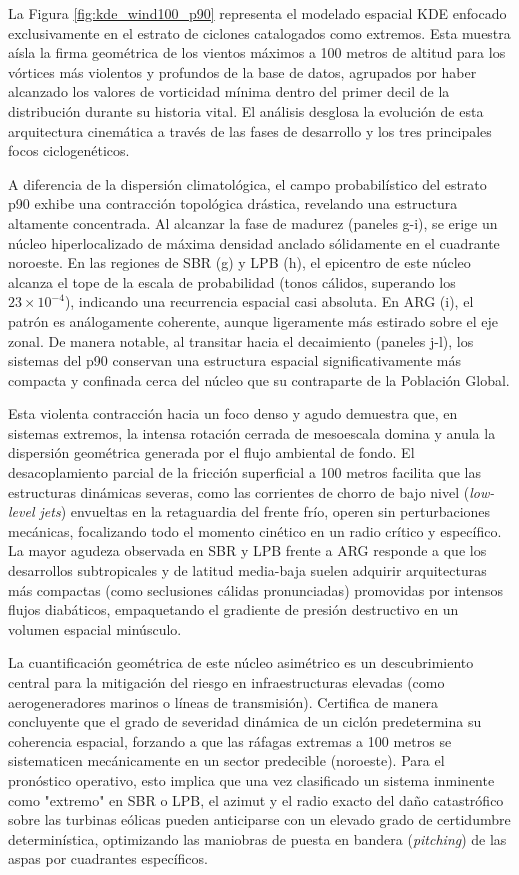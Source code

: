La Figura \ref{fig:kde_wind100_p90} representa el modelado espacial KDE enfocado exclusivamente en el estrato de ciclones catalogados como extremos. Esta muestra aísla la firma geométrica de los vientos máximos a 100 metros de altitud para los vórtices más violentos y profundos de la base de datos, agrupados por haber alcanzado los valores de vorticidad mínima dentro del primer decil de la distribución durante su historia vital. El análisis desglosa la evolución de esta arquitectura cinemática a través de las fases de desarrollo y los tres principales focos ciclogenéticos.

A diferencia de la dispersión climatológica, el campo probabilístico del estrato p90 exhibe una contracción topológica drástica, revelando una estructura altamente concentrada. Al alcanzar la fase de madurez (paneles g-i), se erige un núcleo hiperlocalizado de máxima densidad anclado sólidamente en el cuadrante noroeste. En las regiones de SBR (g) y LPB (h), el epicentro de este núcleo alcanza el tope de la escala de probabilidad (tonos cálidos, superando los $23 \times 10^{-4}$), indicando una recurrencia espacial casi absoluta. En ARG (i), el patrón es análogamente coherente, aunque ligeramente más estirado sobre el eje zonal. De manera notable, al transitar hacia el decaimiento (paneles j-l), los sistemas del p90 conservan una estructura espacial significativamente más compacta y confinada cerca del núcleo que su contraparte de la Población Global. 

Esta violenta contracción hacia un foco denso y agudo demuestra que, en sistemas extremos, la intensa rotación cerrada de mesoescala domina y anula la dispersión geométrica generada por el flujo ambiental de fondo. El desacoplamiento parcial de la fricción superficial a 100 metros facilita que las estructuras dinámicas severas, como las corrientes de chorro de bajo nivel (\textit{low-level jets}) envueltas en la retaguardia del frente frío, operen sin perturbaciones mecánicas, focalizando todo el momento cinético en un radio crítico y específico. La mayor agudeza observada en SBR y LPB frente a ARG responde a que los desarrollos subtropicales y de latitud media-baja suelen adquirir arquitecturas más compactas (como seclusiones cálidas pronunciadas) promovidas por intensos flujos diabáticos, empaquetando el gradiente de presión destructivo en un volumen espacial minúsculo.

La cuantificación geométrica de este núcleo asimétrico es un descubrimiento central para la mitigación del riesgo en infraestructuras elevadas (como aerogeneradores marinos o líneas de transmisión). Certifica de manera concluyente que el grado de severidad dinámica de un ciclón predetermina su coherencia espacial, forzando a que las ráfagas extremas a 100 metros se sistematicen mecánicamente en un sector predecible (noroeste). Para el pronóstico operativo, esto implica que una vez clasificado un sistema inminente como "extremo" en SBR o LPB, el azimut y el radio exacto del daño catastrófico sobre las turbinas eólicas pueden anticiparse con un elevado grado de certidumbre determinística, optimizando las maniobras de puesta en bandera (\textit{pitching}) de las aspas por cuadrantes específicos.

